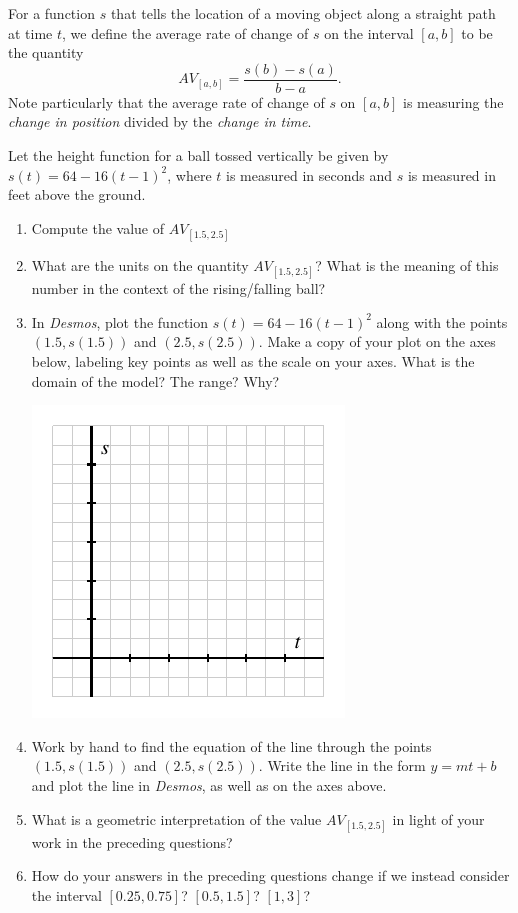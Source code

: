 \documentclass[nooutcomes]{ximera}
\begin{document}
For a function $s$ that tells the location of a moving object along a straight path at time $t$, we define the average rate of change of $s$ on the interval $[a,b]$ to be the quantity%
\begin{equation*}
AV_{[a,b]} = \frac{s(b)-s(a)}{b-a}\text{.}
\end{equation*}
 Note particularly that the average rate of change of $s$ on $[a,b]$ is measuring the \emph{change in position} divided by the \emph{change in time}.%

\begin{exploration}
Let the height function for a ball tossed vertically be given by $s(t) = 64 - 16(t-1)^2$, where $t$ is measured in seconds and $s$ is measured in feet above the ground.
\begin{enumerate}[label=\alph*.]
\item Compute the value of $AV_{[1.5,2.5]}$
\item What are the units on the quantity $AV_{[1.5,2.5]}$? What is the meaning of this number in the context of the rising/falling ball?
\item In \emph{Desmos}, plot the function $s(t) = 64 - 16(t-1)^2$ along with the points $(1.5,s(1.5))$ and $(2.5, s(2.5))$. Make a copy of your plot on the axes below, labeling key points as well as the scale on your axes. What is the domain of the model? The range? Why?
\begin{image}
\includegraphics{aroc-s-t-blank-axes.pdf}
\end{image}
\item Work by hand to find the equation of the line through the points $(1.5,s(1.5))$ and $(2.5, s(2.5))$. Write the line in the form $y = mt + b$ and plot the line in \emph{Desmos}, as well as on the axes above.
\item What is a geometric interpretation of the value $AV_{[1.5,2.5]}$ in light of your work in the preceding questions?
\item How do your answers in the preceding questions change if we instead consider the interval $[0.25, 0.75]$? $[0.5, 1.5]$? $[1,3]$?
\end{enumerate}
\end{exploration}
\end{document}
